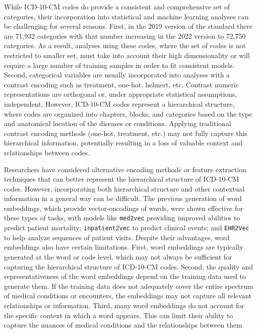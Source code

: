 \documentclass{bmcart}
\begin{document}
While ICD-10-CM codes do provide a consistent and comprehensive set of 
categories, their incorporation into statistical and machine learning analyses 
can be challenging for several reasons. First, in the 2019 version of the 
standard there are 71,932 categories with that number increasing
in the 2022 version to 72,750 categories. As a result, analyses 
using these codes, where the set of codes is not restricted to smaller set, 
must take into account their high dimensionality or will require a large 
number of training samples in order to fit consistent models. Second, 
categorical variables are usually incorporated into analyses with a contrast 
encoding such as treatment, one-hot, helmert, etc. Contrast numeric 
representations are orthogonal or, under appropriate statistical assumptions, 
independent. However, ICD-10-CM codes represent a hierarchical structure, 
where codes are organized into chapters, blocks, and categories based on the 
type and anatomical location of the diseases or conditions. Applying 
traditional contrast encoding methods (one-hot, treatment, etc.) may 
not fully capture this hierarchical information, potentially resulting in a 
loss of valuable context and relationships between codes.

Researchers have considered alternative encoding methods or feature extraction 
techniques that can better represent the hierarchical structure of ICD-10-CM 
codes. However, incorporating both hierarchical structure and other contextual 
information in a general way can be difficult. The previous generation of word 
embeddings, which provide vector-encodings of words, were shown effective for 
these types of tasks, with models like \texttt{med2vec} \cite{med2vec} 
providing improved abilities to predict patient mortality; 
\texttt{inpatient2vec} \cite{inpatient2vec} to predict clinical events; 
and \texttt{EHR2Vec} \cite{ehr2vec} to help analyze sequences of patient 
visits. Despite their advantages, word embeddings also have certain 
limitations. First, word embeddings are typically generated at the word or 
code level, which may not always be sufficient for capturing the hierarchical 
structure of ICD-10-CM codes. Second, the quality and representativeness of 
the word embeddings depend on the training data used to generate them. If the 
training data does not adequately cover the entire spectrum of medical 
conditions or encounters, the embeddings may not capture all relevant 
relationships or information. Third, many word embeddings do not account for 
the specific context in which a word appears. This can limit their ability to 
capture the nuances of medical conditions and the relationships between them.
\end{document}
